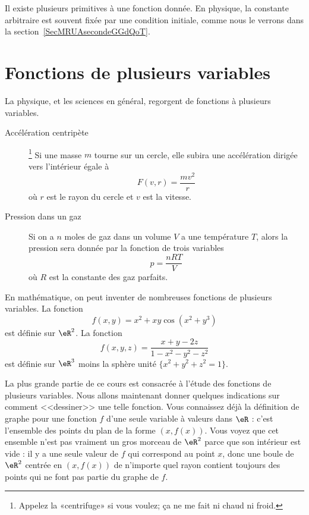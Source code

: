 \begin{normaltext}
    Il existe plusieurs primitives à une fonction donnée. En physique, la constante arbitraire est souvent fixée par une condition initiale, comme nous le verrons dans la section~\ref{SecMRUAsecondeGGdQoT}.
\end{normaltext}

\section{Fonctions de plusieurs variables}

La physique, et les sciences en général, regorgent de fonctions à plusieurs variables.
\begin{description}
    \item[Accélération centripète]\footnote{Appelez la «centrifuge» si vous voulez; ça ne me fait ni chaud ni froid.}  Si une masse $m$ tourne sur un cercle, elle subira une accélération dirigée vers l'intérieur égale à
        \begin{equation}
            F(v,r)=\frac{ mv^2 }{ r }
        \end{equation}
        où $r$ est le rayon du cercle et $v$ est la vitesse.
    \item[Pression dans un gaz] Si on a $n$ moles de gaz dans un volume $V$ a une température $T$, alors la pression sera donnée par la fonction de trois variables
        \begin{equation}
            p=\frac{ nRT }{ V }
        \end{equation}
        où $R$ est la constante des gaz parfaits.
\end{description}

En mathématique, on peut inventer de nombreuses fonctions de plusieurs variables. La fonction
\begin{equation}
    f(x,y)=x^2+xy\cos(x^2+y^3)
\end{equation}
est définie sur $\eR^2$. La fonction
\begin{equation}
    f(x,y,z)=\frac{ x+y-2z }{ 1-x^2-y^2-z^2 }
\end{equation}
est définie sur $\eR^3$ moins la sphère unité $\{ x^2+y^2+z^2=1 \}$.

La plus grande partie de ce cours est consacrée à l'étude des fonctions de plusieurs variables. Nous allons maintenant donner quelques indications sur comment <<dessiner>> une telle fonction. Vous connaissez déjà la définition de graphe pour une fonction $f$ d'une seule variable à valeurs dans $\eR$ : c'est l'ensemble des points du plan de la forme $(x, f(x))$. Vous voyez que cet ensemble n'est pas vraiment un gros morceau de $\eR^2$ parce que son intérieur est vide : il y a une seule valeur de $f$ qui correspond au point $x$, donc une boule de $\eR^2$ centrée en $(x, f(x))$ de n'importe quel rayon contient toujours des points qui ne font pas partie du graphe de $f$.

